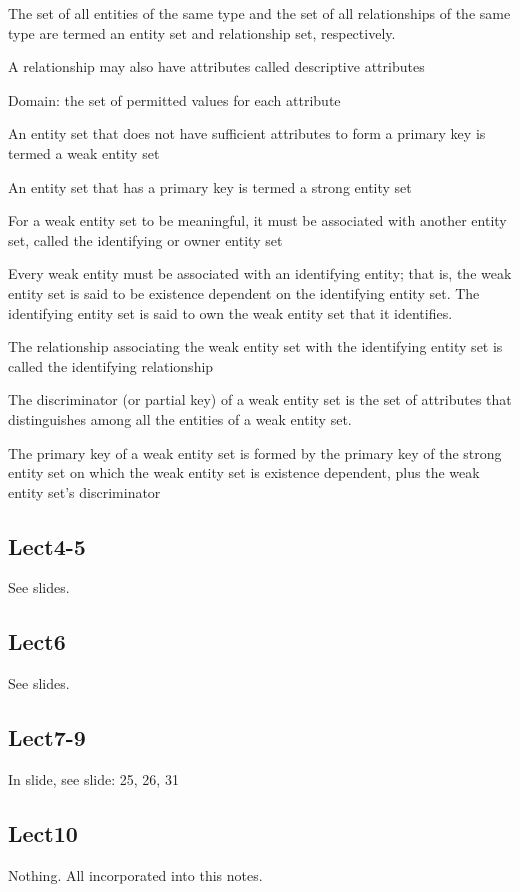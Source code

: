 \documentclass[8pt, a4paper, oneside, twocolumn]{extarticle}
\begin{document}
The set of all entities of the same type and the set of all relationships of the same type are termed an entity set and relationship set, respectively. 

A relationship may also have attributes called descriptive attributes

Domain: the set of permitted values for each attribute 

An entity set that does not have sufficient attributes to form a primary key is termed a weak entity set

An entity set that has a primary key is termed a strong entity set

For a weak entity set to be meaningful, it must be associated with another entity set, called the identifying or owner entity set

Every weak entity must be associated with an identifying entity; that is, the weak entity set is said to be existence dependent on the  identifying entity set. The identifying entity set is said to  own the  weak entity set that it identifies. 

The relationship associating the weak entity set with the identifying  entity set is called the identifying relationship

The discriminator (or partial key) of a weak entity set is the set of attributes that distinguishes among all the entities of a weak entity set.

The primary key of a weak entity set is formed by the primary key of the strong entity set on which the weak entity set is existence dependent, plus the weak entity set’s discriminator
\subsection{Lect4-5}
See slides.
\subsection{Lect6}
See slides.
\subsection{Lect7-9}
In slide, see slide: 25, 26, 31
\subsection{Lect10}
Nothing. All incorporated into this notes.
\end{document}
